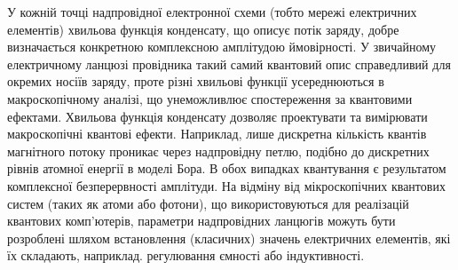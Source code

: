 \documentclass[a4paper,14pt]{extreport}
\begin{document}
У кожній точці надпровідної електронної схеми (тобто мережі електричних елементів) хвильова функція конденсату, що описує потік заряду, добре визначається конкретною комплексною амплітудою ймовірності. У звичайному електричному ланцюзі провідника такий самий квантовий опис справедливий для окремих носіїв заряду, проте різні хвильові функції усереднюються в макроскопічному аналізі, що унеможливлює спостереження за квантовими ефектами. Хвильова функція конденсату дозволяє проектувати та вимірювати макроскопічні квантові ефекти. Наприклад, лише дискретна кількість квантів магнітного потоку проникає через надпровідну петлю, подібно до дискретних рівнів атомної енергії в моделі Бора. В обох випадках квантування є результатом комплексної безперервності амплітуди. На відміну від мікроскопічних квантових систем (таких як атоми або фотони), що використовуються для реалізацій квантових комп’ютерів, параметри надпровідних ланцюгів можуть бути розроблені шляхом встановлення (класичних) значень електричних елементів, які їх складають, наприклад. регулювання ємності або індуктивності.\\ 


\end{document}
